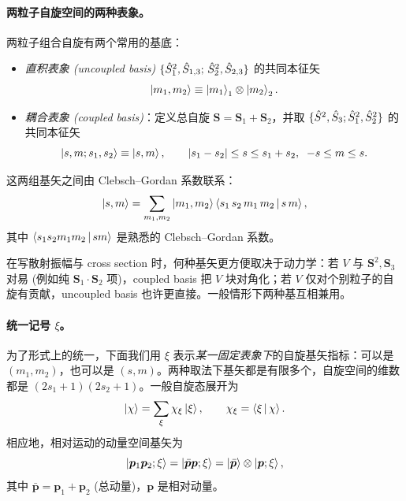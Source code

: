 \paragraph{两粒子自旋空间的两种表象。}两粒子组合自旋有两个常用的基底：
\begin{itemize}
  \item \emph{直积表象 (uncoupled basis)} $\{\hat{S}_1^2,\hat{S}_{1,3};\,\hat{S}_2^2,\hat{S}_{2,3}\}$ 的共同本征矢
  \begin{equation}
    \ket{m_1,m_2}\equiv\ket{m_1}_1\otimes\ket{m_2}_2.
    \label{eq:uncoupled-basis}
  \end{equation}
  \item \emph{耦合表象 (coupled basis)}：定义总自旋 $\bm S=\bm S_1+\bm S_2$，并取 $\{\hat{S}^2,\hat{S}_3;\hat{S}_1^2,\hat{S}_2^2\}$ 的共同本征矢
  \begin{equation}
    \ket{s,m;s_1,s_2}\equiv\ket{s,m},\qquad |s_1-s_2|\le s\le s_1+s_2,\;\; -s\le m\le s.
    \label{eq:coupled-basis}
  \end{equation}
\end{itemize}
这两组基矢之间由 Clebsch--Gordan 系数联系：
\begin{equation}
  \ket{s,m}=\sum_{m_1,m_2}\ket{m_1,m_2}\left\langle s_1\,s_2\,m_1\,m_2 \,\middle|\, s\,m \right\rangle,
  \label{eq:CG}
\end{equation}
其中 $\left\langle s_1 s_2 m_1 m_2 \,\middle|\, s m \right\rangle$ 是熟悉的 Clebsch--Gordan 系数。

\begin{remark}
  在写散射振幅与 cross section 时，何种基矢更方便取决于动力学：若 $V$ 与 $\bm S^2,\bm S_3$ 对易 (例如纯 $\bm S_1\cdot\bm S_2$ 项)，coupled basis 把 $V$ 块对角化；若 $V$ 仅对个别粒子的自旋有贡献，uncoupled basis 也许更直接。一般情形下两种基互相兼用。
\end{remark}

\paragraph{统一记号 $\xi$。}为了形式上的统一，下面我们用 $\xi$ 表示\emph{某一固定表象下\!}的自旋基矢指标：可以是 $(m_1,m_2)$，也可以是 $(s,m)$。两种取法下基矢都是有限多个，自旋空间的维数都是 $(2s_1+1)(2s_2+1)$。一般自旋态展开为
\begin{equation}
  \ket{\chi}=\sum_{\xi}\chi_\xi\ket{\xi},\qquad \chi_\xi=\left\langle \xi \,\middle|\, \chi \right\rangle.
  \label{eq:xi-expansion}
\end{equation}
相应地，相对运动的动量空间基矢为
\begin{equation}
  \ket{\bm p_1\bm p_2;\xi}=\ket{\bar{\bm p}\bm p;\xi}=\ket{\bar{\bm p}}\otimes\ket{\bm p;\xi},
  \label{eq:basis-2p-spin}
\end{equation}
其中 $\bar{\bm p}=\bm p_1+\bm p_2$ (总动量)，$\bm p$ 是相对动量。

